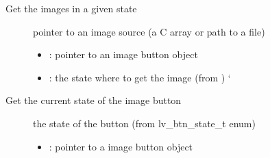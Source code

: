 \documentclass[letterpaper,10pt,english]{sphinxmanual}
\begin{document}
\begin{fulllineitems}
\label{\detokenize{object-types/imgbtn:_CPPv417lv_imgbtn_get_srcP8lv_obj_t14lv_btn_state_t}}%
\pysigstartmultiline
{}\label{\detokenize{object-types/imgbtn:lv__imgbtn_8h_1a21c64333c0e0eb113270abe1ebb4bc13}}%
\pysigstopmultiline
Get the images in a given state \begin{description}
\item[{}] \leavevmode
pointer to an image source (a C array or path to a file) 

\item[{}] \leavevmode\begin{itemize}
\item {} 
: pointer to an image button object 

\item {} 
: the state where to get the image (from ) {}` 

\end{itemize}

\end{description}


\end{fulllineitems}


\begin{fulllineitems}
\label{\detokenize{object-types/imgbtn:_CPPv419lv_imgbtn_get_statePK8lv_obj_t}}%
\pysigstartmultiline
{}\label{\detokenize{object-types/imgbtn:lv__imgbtn_8h_1a394673217c8152c16ce01e38b3f9513a}}%
\pysigstopmultiline
Get the current state of the image button \begin{description}
\item[{}] \leavevmode
the state of the button (from lv\_btn\_state\_t enum) 

\item[{}] \leavevmode\begin{itemize}
\item {} 
: pointer to a image button object 

\end{itemize}

\end{description}


\end{fulllineitems}
\end{document}
